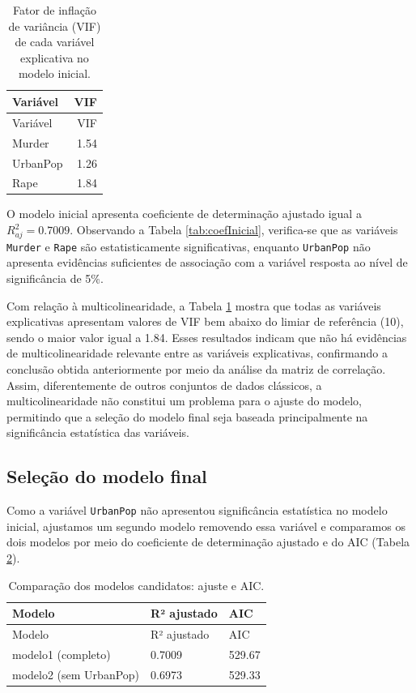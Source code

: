 \documentclass[a4paper]{modeloUFCG} %
\begin{document}
\begin{longtable}[]{@{}lr@{}}
\caption{\label{tab:vifCompleto} Fator de inflação de variância (VIF) de cada variável explicativa no modelo inicial.}\tabularnewline
\toprule\noalign{}
Variável & VIF \\
\midrule\noalign{}
\endfirsthead
\toprule\noalign{}
Variável & VIF \\
\midrule\noalign{}
\endhead
\bottomrule\noalign{}
\endlastfoot
Murder & 1.54 \\
UrbanPop & 1.26 \\
Rape & 1.84 \\
\end{longtable}

O modelo inicial apresenta coeficiente de determinação ajustado igual a \(R^2_{aj} = 0.7009\).
Observando a Tabela \ref{tab:coefInicial}, verifica-se que as variáveis \texttt{Murder} e \texttt{Rape} são estatisticamente significativas,
enquanto \texttt{UrbanPop} não apresenta evidências suficientes de associação com a variável resposta ao nível de significância de 5\%.

Com relação à multicolinearidade, a Tabela \ref{tab:vifCompleto} mostra que todas as variáveis explicativas apresentam valores de VIF bem abaixo do limiar de referência (10), sendo o maior valor igual a 1.84. Esses resultados indicam que não há evidências de multicolinearidade relevante entre as variáveis explicativas, confirmando a conclusão obtida anteriormente por meio da análise da matriz de correlação. Assim, diferentemente de outros conjuntos de dados clássicos, a multicolinearidade não constitui um problema para o ajuste do modelo, permitindo que a seleção do modelo final seja baseada principalmente na significância estatística das variáveis.

\subsection{Seleção do modelo final}\label{seleuxe7uxe3o-do-modelo-final}

Como a variável \texttt{UrbanPop} não apresentou significância estatística no modelo inicial, ajustamos um segundo modelo removendo essa variável e comparamos os dois modelos por meio do coeficiente de determinação ajustado e do AIC (Tabela \ref{tab:selecaoModelos}).

\begin{longtable}[]{@{}lll@{}}
\caption{\label{tab:modelosCandidatos}\label{tab:selecaoModelos} Comparação dos modelos candidatos: ajuste e AIC.}\tabularnewline
\toprule\noalign{}
Modelo & R² ajustado & AIC \\
\midrule\noalign{}
\endfirsthead
\toprule\noalign{}
Modelo & R² ajustado & AIC \\
\midrule\noalign{}
\endhead
\bottomrule\noalign{}
\endlastfoot
modelo1 (completo) & 0.7009 & 529.67 \\
modelo2 (sem UrbanPop) & 0.6973 & 529.33 \\
\end{longtable}
\end{document}
